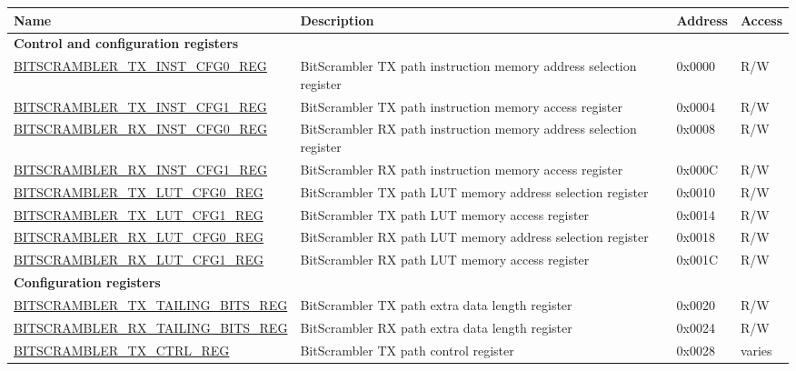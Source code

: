 
\begin{longtable}{ | p{6.3cm} | p{7cm} | p{1.2cm} | p{1cm} | }
\hline\rowcolor{lightgray}
Name & Description &  Address & Access \\ \hline
\endhead
\multicolumn{4}{|l|}{\textbf{Control and configuration registers}} \\ \hline
\hyperref[regdesc:BITSCRAMBLERTXINSTCFG0REG]{BITSCRAMBLER\_TX\_INST\_CFG0\_REG} & BitScrambler TX path instruction memory address selection register & 0x0000 & R/W \\ \hline
\hyperref[regdesc:BITSCRAMBLERTXINSTCFG1REG]{BITSCRAMBLER\_TX\_INST\_CFG1\_REG} & BitScrambler TX path instruction memory access register & 0x0004 & R/W \\ \hline
\hyperref[regdesc:BITSCRAMBLERRXINSTCFG0REG]{BITSCRAMBLER\_RX\_INST\_CFG0\_REG} & BitScrambler RX path instruction memory address selection register & 0x0008 & R/W \\ \hline
\hyperref[regdesc:BITSCRAMBLERRXINSTCFG1REG]{BITSCRAMBLER\_RX\_INST\_CFG1\_REG} & BitScrambler RX path instruction memory access register & 0x000C & R/W \\ \hline
\hyperref[regdesc:BITSCRAMBLERTXLUTCFG0REG]{BITSCRAMBLER\_TX\_LUT\_CFG0\_REG} & BitScrambler TX path LUT memory address selection register & 0x0010 & R/W \\ \hline
\hyperref[regdesc:BITSCRAMBLERTXLUTCFG1REG]{BITSCRAMBLER\_TX\_LUT\_CFG1\_REG} & BitScrambler TX path LUT memory access register & 0x0014 & R/W \\ \hline
\hyperref[regdesc:BITSCRAMBLERRXLUTCFG0REG]{BITSCRAMBLER\_RX\_LUT\_CFG0\_REG} & BitScrambler RX path LUT memory address selection register & 0x0018 & R/W \\ \hline
\hyperref[regdesc:BITSCRAMBLERRXLUTCFG1REG]{BITSCRAMBLER\_RX\_LUT\_CFG1\_REG} & BitScrambler RX path LUT memory access register & 0x001C & R/W \\ \hline
\multicolumn{4}{|l|}{\textbf{Configuration registers}} \\ \hline
\hyperref[regdesc:BITSCRAMBLERTXTAILINGBITSREG]{BITSCRAMBLER\_TX\_TAILING\_BITS\_REG} & BitScrambler TX path extra data length register & 0x0020 & R/W \\ \hline
\hyperref[regdesc:BITSCRAMBLERRXTAILINGBITSREG]{BITSCRAMBLER\_RX\_TAILING\_BITS\_REG} & BitScrambler RX path extra data length register & 0x0024 & R/W \\ \hline
\hyperref[regdesc:BITSCRAMBLERTXCTRLREG]{BITSCRAMBLER\_TX\_CTRL\_REG} & BitScrambler TX path control register & 0x0028 & varies \\ \hline

\end{longtable}
